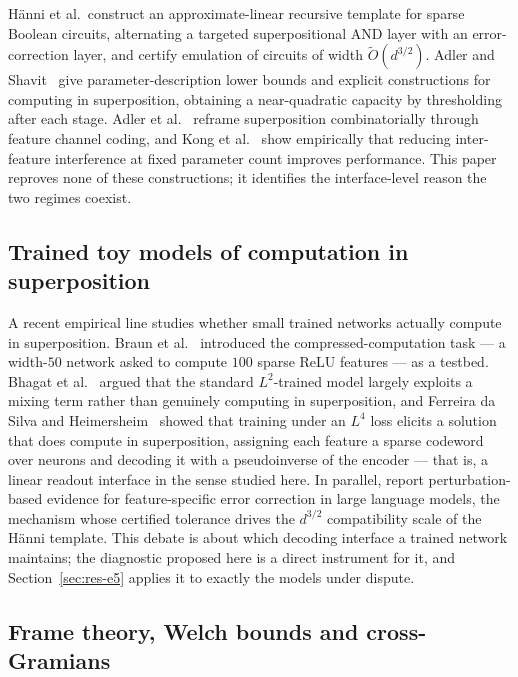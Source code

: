 \documentclass[preprint,12pt]{elsarticle}
\theoremstyle{definition}
\newcommand{\Otilde}{\widetilde{O}}
\begin{document}
H\"{a}nni et al.\ construct an approximate-linear recursive template for sparse Boolean
circuits, alternating a targeted superpositional AND layer with an error-correction layer, and
certify emulation of circuits of width $\Otilde(d^{3/2})$. Adler and
Shavit~\cite{adler2024superposition} give parameter-description lower bounds and explicit
constructions for computing in superposition, obtaining a near-quadratic capacity by
thresholding after each stage. Adler et al.~\cite{adler2025combinatorial} reframe superposition
combinatorially through feature channel coding, and Kong et al.~\cite{kong2025expand} show
empirically that reducing inter-feature interference at fixed parameter count improves
performance. This paper reproves none of these constructions; it identifies the interface-level
reason the two regimes coexist.

\subsection{Trained toy models of computation in superposition}

A recent empirical line studies whether small trained networks actually compute in
superposition. Braun et al.~\cite{braun2025apd} introduced the compressed-computation task ---
a width-$50$ network asked to compute $100$ sparse ReLU features --- as a testbed. Bhagat et
al.~\cite{bhagat2026cc} argued that the standard $L^2$-trained model largely exploits a mixing
term rather than genuinely computing in superposition, and Ferreira da Silva and
Heimersheim~\cite{ferreiradasilva2026l4} showed that training under an $L^4$ loss elicits a
solution that does compute in superposition, assigning each feature a sparse codeword over
neurons and decoding it with a pseudoinverse of the encoder --- that is, a linear readout
interface in the sense studied here. In parallel,
\cite{ferreiradasilva2026errcorr} report perturbation-based evidence for feature-specific
error correction in large language models, the mechanism whose certified tolerance drives the
$d^{3/2}$ compatibility scale of the H\"{a}nni template. This debate is about which decoding
interface a trained network maintains; the diagnostic proposed here is a direct instrument for
it, and Section~\ref{sec:res-e5} applies it to exactly the models under dispute.

\subsection{Frame theory, Welch bounds and cross-Gramians}
\label{sec:frames}
\end{document}

